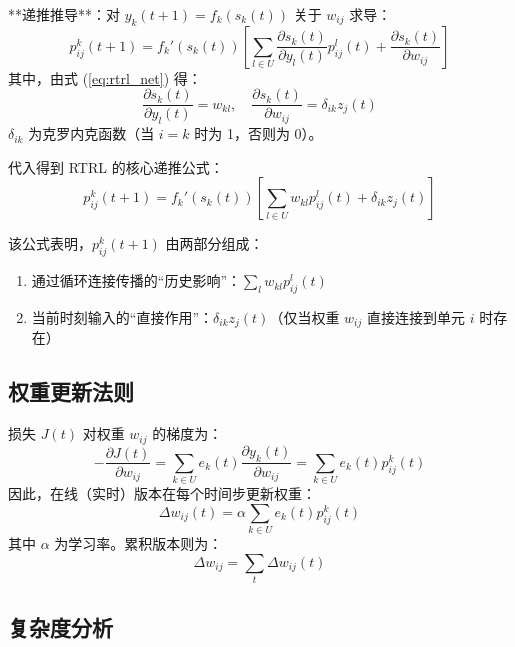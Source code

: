 \documentclass{article}
\begin{document}
**递推推导**：对 $y_k(t+1) = f_k(s_k(t))$ 关于 $w_{ij}$ 求导：
\begin{equation}
p_{ij}^k(t+1) = f_k'(s_k(t)) \left[ \sum_{l \in U} \frac{\partial s_k(t)}{\partial y_l(t)} p_{ij}^l(t) + \frac{\partial s_k(t)}{\partial w_{ij}} \right]
\label{eq:rtrl_p_deriv}
\end{equation}
其中，由式 (\ref{eq:rtrl_net}) 得：
\begin{equation}
\frac{\partial s_k(t)}{\partial y_l(t)} = w_{kl}, \quad \frac{\partial s_k(t)}{\partial w_{ij}} = \delta_{ik} z_j(t)
\label{eq:rtrl_partials}
\end{equation}
$\delta_{ik}$ 为克罗内克函数（当 $i=k$ 时为 1，否则为 0）。

代入得到 RTRL 的核心递推公式：
\begin{equation}
\boxed{
p_{ij}^k(t+1) = f_k'(s_k(t)) \left[ \sum_{l \in U} w_{kl} p_{ij}^l(t) + \delta_{ik} z_j(t) \right]
}
\label{eq:rtrl_recursion}
\end{equation}

该公式表明，$p_{ij}^k(t+1)$ 由两部分组成：
\begin{enumerate}
    \item 通过循环连接传播的“历史影响”：$\sum_l w_{kl} p_{ij}^l(t)$
    \item 当前时刻输入的“直接作用”：$\delta_{ik} z_j(t)$（仅当权重 $w_{ij}$ 直接连接到单元 $i$ 时存在）
\end{enumerate}

\subsection{权重更新法则}

损失 $J(t)$ 对权重 $w_{ij}$ 的梯度为：
\begin{equation}
-\frac{\partial J(t)}{\partial w_{ij}} = \sum_{k \in U} e_k(t) \frac{\partial y_k(t)}{\partial w_{ij}} = \sum_{k \in U} e_k(t) p_{ij}^k(t)
\label{eq:rtrl_grad}
\end{equation}
因此，在线（实时）版本在每个时间步更新权重：
\begin{equation}
\boxed{
\Delta w_{ij}(t) = \alpha \sum_{k \in U} e_k(t) p_{ij}^k(t)
}
\label{eq:rtrl_update}
\end{equation}
其中 $\alpha$ 为学习率。累积版本则为：
\begin{equation}
\Delta w_{ij} = \sum_{t} \Delta w_{ij}(t)
\label{eq:rtrl_accum}
\end{equation}

\subsection{复杂度分析}
\end{document}
